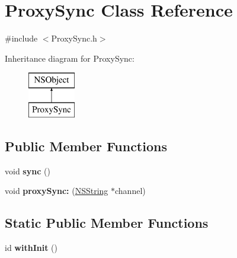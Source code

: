\hypertarget{interface_proxy_sync}{
\section{\-Proxy\-Sync \-Class \-Reference}
\label{interface_proxy_sync}
}


{\ttfamily \#include $<$\-Proxy\-Sync.\-h$>$}

\-Inheritance diagram for \-Proxy\-Sync\-:\begin{figure}[H]
\begin{center}
\leavevmode
\includegraphics[height=2.000000cm]{interface_proxy_sync}
\end{center}
\end{figure}
\subsection*{\-Public \-Member \-Functions}
\begin{DoxyCompactItemize}
\item 
\hypertarget{interface_proxy_sync_a6c94ba48c36d5c1a584289aaab70d990}{
void {\bfseries sync} ()}
\label{interface_proxy_sync_a6c94ba48c36d5c1a584289aaab70d990}

\item 
\hypertarget{interface_proxy_sync_a4700a16e682274c0e91ab658bc3cf188}{
void {\bfseries proxy\-Sync\-:} (\hyperlink{class_n_s_string}{\-N\-S\-String} $\ast$channel)}
\label{interface_proxy_sync_a4700a16e682274c0e91ab658bc3cf188}

\end{DoxyCompactItemize}
\subsection*{\-Static \-Public \-Member \-Functions}
\begin{DoxyCompactItemize}
\item 
\hypertarget{interface_proxy_sync_a978924381d291e1601844437ea2eff77}{
id {\bfseries with\-Init} ()}
\label{interface_proxy_sync_a978924381d291e1601844437ea2eff77}

\end{DoxyCompactItemize}


